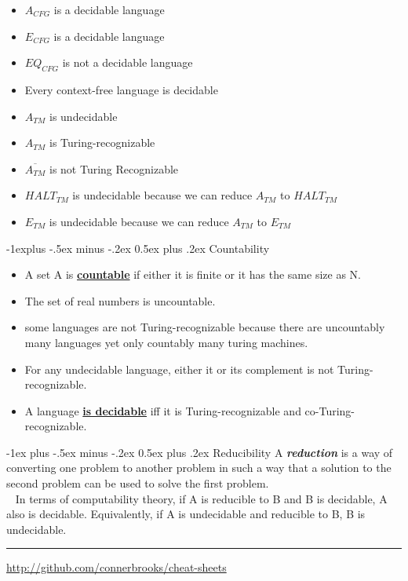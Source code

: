 \documentclass[10pt,landscape]{article}
\makeatletter
\renewcommand{\section}{\@startsection{section}{1}{0mm}%
                                {-1ex plus -.5ex minus -.2ex}%
                                {0.5ex plus .2ex}%
                                {\normalfont\large\bfseries}}
\renewcommand{\subsection}{\@startsection{subsection}{2}{0mm}%
                                {-1explus -.5ex minus -.2ex}%
                                {0.5ex plus .2ex}%
                                {\normalfont\normalsize\bfseries}}
\makeatother
\begin{document}
\begin{multicols}{3}
\begin{itemize}
	\item $A_{CFG}$ is a decidable language
	\item $E_{CFG}$ is a decidable language
	\item $EQ_{CFG}$ is not a decidable language
	\item Every context-free language is decidable	
	\item $A_{TM}$ is undecidable
	\item $A_{TM}$ is Turing-recognizable
	\item $\overline{A_{TM}}$ is not Turing Recognizable
	\item $HALT_{TM}$ is undecidable because we can reduce $A_{TM}$ to $HALT_{TM}$
	\item $E_{TM}$ is undecidable because we can reduce $A_{TM}$ to $E_{TM}$
\end{itemize}

\subsection{Countability}
\begin{itemize}
	\item A set A is \underline{\textbf{countable}} if either it is finite or it has the same size as N.
	\item The set of real numbers is uncountable.
	\item some languages are not Turing-recognizable because there are uncountably many languages yet only countably many turing machines.
	\item For any undecidable language, either it or its complement is not Turing-recognizable.
	\item A language \underline{\textbf{is decidable}} iff it is Turing-recognizable and co-Turing-recognizable.
\end{itemize}

\section{Reducibility}
A \textbf{\textit{reduction}} is a way of converting one problem to another problem in such a way that a solution to the second problem can be used to solve the first problem.\\
\ \newline
In terms of computability theory, if A is reducible to B and B is decidable, A also is decidable. Equivalently, if A is undecidable and reducible to B, B is undecidable.

\rule{0.3\linewidth}{0.25pt}
\scriptsize


\href{http://github.com/connerbrooks/cheat-sheets}{http://github.com/connerbrooks/cheat-sheets}

\end{multicols}
\end{document}
